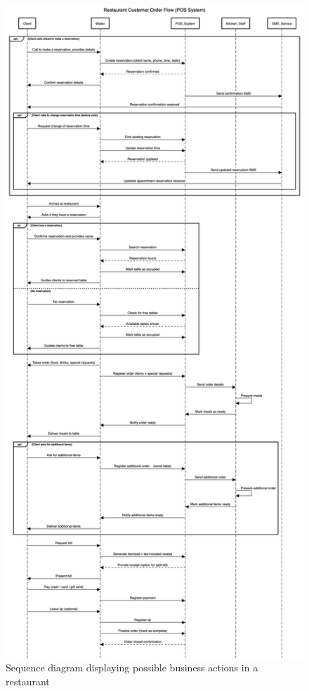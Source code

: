 \documentclass[11pt,a4paper,pdftex]{article}
\begin{document}
\begin{figure}[H]
    \centering
    \includegraphics[scale=0.22]{graphics/restaurant.png}
    \caption{Sequence diagram displaying possible business actions in a restaurant}
    \label{figures:sequence_restaurant}
\end{figure}
% 
\end{document}

